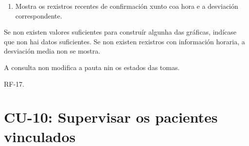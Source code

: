 \begin{description}
\begin{enumerate}
    \item Mostra os rexistros recentes de confirmación xunto coa hora e a
    desviación correspondente.
\end{enumerate}

\item[Fluxos alternativos:] Se non existen valores suficientes para construír
algunha das gráficas, indícase que non hai datos suficientes. Se non existen
rexistros con información horaria, a desviación media non se mostra.

\item[Postcondicións:] A consulta non modifica a pauta nin os estados das tomas.

\item[Requisitos relacionados:] RF-17.

\end{description}



\section{CU-10: Supervisar os pacientes vinculados}
\label{cu:supervisar-pacientes}

